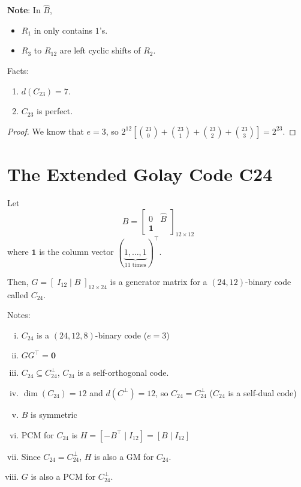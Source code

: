 \textbf{Note}: In $ \hat{B} $,
\begin{itemize}
    \item $ R_1 $ in only contains $ 1 $'s.
    \item $ R_3 $ to $ R_{12} $ are left cyclic shifts of $ R_2 $.
\end{itemize}

\begin{thmbox}
    \begin{theorem}
        Facts:
        \begin{enumerate}
            \item $ d(C_{23})=7 $.
            \item $ C_{23} $ is perfect.
        \end{enumerate}
    \end{theorem}
\end{thmbox}

\begin{proof}
    We know that $ e=3 $, so
    $ 2^{12}\left[ \binom{23}{0}+\binom{23}{1}+\binom{23}{2}+\binom{23}{3} \right]=
        2^{23} $.
\end{proof}

\section{The Extended Golay Code C24}
Let
\[ B=
    \left[
        \begin{array}{c|c}
            0 & \hat{B} \\
            \bm{1}
        \end{array}
        \right]_{12\times 12}
\]
where $ \bm{1} $ is the column vector $ (\underbrace{1,\ldots ,1}_{11\text{ times}})^\top $.

Then, $ G=\left[\; I_{12}\mid B \;\right]_{12\times 24} $ is a generator
matrix for a $ (24,12) $-binary code called $ C_{24} $.

Notes:
\begin{enumerate}[(i)]
    \item $ C_{24} $ is a $ (24,12,8) $-binary code ($ e=3 $)
    \item $ GG^\top=\bm{0} $
    \item $ C_{24}\subseteq C_{24}^\perp $, $ C_{24} $ is a self-orthogonal code.
    \item $ \dim (C_{24})=12 $ and $ d(C^{\perp})=12 $, so
          $ C_{24}=C_{24}^\perp $ ($ C_{24} $ is a self-dual code)
    \item $ B $ is symmetric
    \item PCM for $ C_{24} $ is $ H=\left[ -B ^\top \mid I_{12} \right]=
              \left[ B\mid I_{12} \right] $
    \item Since $ C_{24}=C_{24}^\perp $, $ H $ is also a GM for $ C_{24} $.
    \item $ G $ is also a PCM for $ C_{24}^\perp $.
\end{enumerate}

